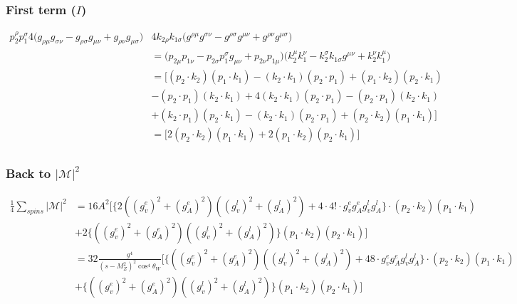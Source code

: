 \documentclass[11pt]{article}
\begin{document}
\subsubsection{First term ($I$)}
\begin{align*} 
 p_2^{\rho} p_1^{\sigma} 4\big(
g_{\rho \mu} g_{\sigma \nu} - g_{\rho \sigma} g_{\mu \nu} + g_{\rho \nu} g_{\mu \sigma}
\Big)& 4k_{2\rho} k_{1\sigma}\Big( g^{\rho \mu} g^{\sigma \nu} - g^{\rho \sigma} g^{\mu \nu}
+ g^{\rho \nu} g^{\mu \sigma} \Big)\\
&= \big( p_{2 \mu} p_{1 \nu} - p_{2 \sigma} p_1^{ \sigma} g_{\mu \nu} + p_{2 \nu} p_{1 \mu} \Big)
\Big(k_2^{\mu} k_1^{\nu} - k_2^{\sigma} k_{1 \sigma} g^{\mu \nu} + k_2^{\nu} k_1^{\mu}\Big)\\ &= 
\Big[ (p_2 \cdot k_2) (p_1 \cdot k_1) - (k_2 \cdot k_1) (p_2 \cdot p_1) + (p_1 \cdot k_2) (p_2 \cdot k_1)\\ & - (p_2 \cdot p_1) (k_2 \cdot k_1) 
+ 4(k_2 \cdot k_1) (p_2 \cdot p_1) - (p_2 \cdot p_1) (k_2 \cdot k_1)\\ &  +(k_2 \cdot p_1) (p_2 \cdot k_1)
- (k_2 \cdot k_1) (p_2 \cdot p_1) + (p_2 \cdot k_2) (p_1 \cdot k_1) \Big]\\ &= \Big[ 2(p_2 \cdot k_2) (p_1 \cdot k_1)  + 2(p_1 \cdot k_2) (p_2 \cdot k_1) \Big]\\
\end{align*}

\subsubsection*{Back to $|\mathcal{M}|^2$}
\begin{center}
\begin{align*}
\frac{1}{4} \sum_{spins}| \mathcal{M}|^2 &= 16 A^2 \Big[
 \{2 ((g_v^e)^2 + (g_A^e)^2)  ((g_v^l)^2 + (g_A^l)^2) + 4 \cdot 4! \cdot g_v^e g_A^e g_v^l g_A^l\} \cdot
(p_2 \cdot k_2) (p_1 \cdot k_1)\\
& + 2 \{((g_v^e)^2 + (g_A^e)^2)  ((g_v^l)^2 + (g_A^l)^2)\}(p_1 \cdot k_2) (p_2 \cdot k_1) \Big]\\
&= 32 \frac{g^4}{(s - M_Z^2)^2\cos^4 \theta_W} \Big[
 \{((g_v^e)^2 + (g_A^e)^2)  ((g_v^l)^2 + (g_A^l)^2) + 48 \cdot g_v^e g_A^e g_v^l g_A^l\} \cdot
(p_2 \cdot k_2) (p_1 \cdot k_1)\\
& +  \{((g_v^e)^2 + (g_A^e)^2)  ((g_v^l)^2 + (g_A^l)^2)\}(p_1 \cdot k_2) (p_2 \cdot k_1) \Big]\\
\end{align*}
\end{center}
\end{document}
